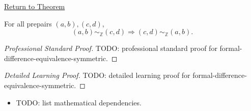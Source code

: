 \newpage
{}
\label{prf:formal-difference-equivalence-symmetric}

\begin{remark*}[Return]
\hyperref[lem:formal-difference-equivalence-symmetric]{Return to Theorem}
\end{remark*}

\begin{lemma*}
For all prepairs $(a,b),(c,d)$,
\[
(a,b)\sim_{\mathbb{Z}}(c,d)
\Longrightarrow
(c,d)\sim_{\mathbb{Z}}(a,b).
\]
\end{lemma*}

\begin{proof}[Professional Standard Proof]
\LRAProofBodyStart
TODO: professional standard proof for formal-difference-equivalence-symmetric.
\end{proof}

\begin{proof}[Detailed Learning Proof]
\LRAProofBodyStart
TODO: detailed learning proof for formal-difference-equivalence-symmetric.
\end{proof}

\begin{remark*}
\end{remark*}

\begin{dependencies}
\begin{itemize}
  \item TODO: list mathematical dependencies.
\end{itemize}
\end{dependencies}

\clearpage
